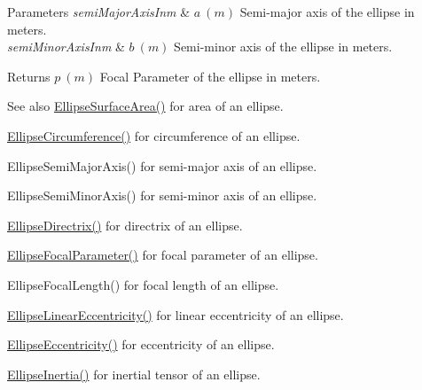 \begin{DoxyParams}{Parameters}
{\em semi\+Major\+Axis\+Inm} & $ a\ (m)$ Semi-\/major axis of the ellipse in meters. \\
\hline
{\em semi\+Minor\+Axis\+Inm} & $ b\ (m)$ Semi-\/minor axis of the ellipse in meters. \\
\hline
\end{DoxyParams}
\begin{DoxyReturn}{Returns}
$ p\ (m)$ Focal Parameter of the ellipse in meters. 
\end{DoxyReturn}
\begin{DoxySeeAlso}{See also}
\mbox{\hyperlink{group___e_g_x_math-_geometry-2_d-_ellipse-_surface_area_ga4ce8c8323e9718ce5458f4ab7f6d823d}{Ellipse\+Surface\+Area()}} for area of an ellipse. 

\mbox{\hyperlink{group___e_g_x_math-_geometry-2_d-_ellipse-_circumference_ga4172802ac674eb53467b44928ac635c7}{Ellipse\+Circumference()}} for circumference of an ellipse. 

Ellipse\+Semi\+Major\+Axis() for semi-\/major axis of an ellipse. 

Ellipse\+Semi\+Minor\+Axis() for semi-\/minor axis of an ellipse. 

\mbox{\hyperlink{group___e_g_x_math-_geometry-2_d-_ellipse-_directrix_gace8f72a8efbc9c18d3eb689151405106}{Ellipse\+Directrix()}} for directrix of an ellipse. 

\mbox{\hyperlink{group___e_g_x_math-_geometry-2_d-_ellipse-_focal_parameter_ga4cd01a38c72c092ef9791351948bf69b}{Ellipse\+Focal\+Parameter()}} for focal parameter of an ellipse. 

Ellipse\+Focal\+Length() for focal length of an ellipse. 

\mbox{\hyperlink{group___e_g_x_math-_geometry-2_d-_ellipse-_linear_eccentricity_gac70b3010e30aa8b73deb50fe2b9b9a91}{Ellipse\+Linear\+Eccentricity()}} for linear eccentricity of an ellipse. 

\mbox{\hyperlink{group___e_g_x_math-_geometry-2_d-_ellipse-_eccentricity_ga6a0a7fba17f782616894cfc447628c33}{Ellipse\+Eccentricity()}} for eccentricity of an ellipse. 

\mbox{\hyperlink{group___e_g_x_math-_geometry-2_d-_ellipse-_inertia_ga10a3049c2f04b50f271fb01dc62e4cf8}{Ellipse\+Inertia()}} for inertial tensor of an ellipse. 
\end{DoxySeeAlso}
